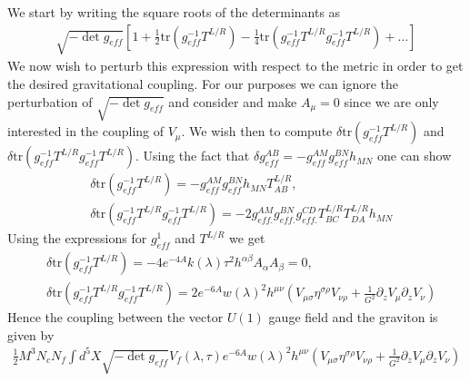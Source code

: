 \documentclass[a4paper,12pt]{article}
\begin{document}
We start by writing the square roots of the determinants as
\begin{align}
	\sqrt{-\det g_{eff}} \left[ 1 + \frac{1}{2} \text{tr} \left( g^{-1}_{eff} T^{L/R}\right) - \frac{1}{4} \text{tr} \left( g^{-1}_{eff} T^{L/R} g^{-1}_{eff} T^{L/R} \right) + \dots \right]
\end{align}
We now wish to perturb this expression with respect to the metric in order to get the desired gravitational coupling. For our purposes we can ignore the perturbation of $\sqrt{-\det g_{eff}}$ and consider and make $A_{\mu} = 0$ since we are only interested in the coupling of $V_\mu$. We wish then to compute $\delta \text{tr} \left( g^{-1}_{eff} T^{L/R}\right)$ and $\delta \text{tr} \left( g^{-1}_{eff} T^{L/R} g^{-1}_{eff} T^{L/R} \right)$. Using the fact that $\delta g^{AB}_{eff} = - g_{eff}^{AM} g_{eff}^{BN} h_{MN}$ one can show
\begin{align}
&\delta \text{tr} \left( g^{-1}_{eff} T^{L/R}\right) = -  g_{eff}^{AM} g_{eff}^{BN} h_{MN} T^{L/R}_{AB}, \\
&\delta \text{tr} \left( g^{-1}_{eff} T^{L/R} g^{-1}_{eff} T^{L/R} \right) = - 2 g^{AM}_{eff.} g^{BN}_{eff.} g^{CD}_{eff.} T^{L/R}_{BC} T^{L/R}_{DA} h_{MN}
\end{align}
Using the expressions for $g^{1}_{eff}$ and $T^{L/R}$ we get
\begin{align}
&\delta \text{tr} \left( g^{-1}_{eff} T^{L/R}\right) = - 4 e^{-4A} k\left(\lambda\right) \tau^2 h^{\alpha \beta} A_\alpha A_\beta = 0 , \\
& \delta \text{tr} \left( g^{-1}_{eff} T^{L/R} g^{-1}_{eff} T^{L/R} \right)  = 2 e^{-6A} {w\left( \lambda \right)}^2 h^{\mu \nu} \left( V_{\mu \sigma} \eta^{\sigma \rho} V_{\nu \rho} + \frac{1}{G^2} \partial_z V_\mu \partial_z V_\nu \right)
\end{align}
Hence the coupling between the vector $U(1)$ gauge field and the graviton is given by
\begin{align}
\frac{1}{2} M^3 N_c N_f \int d^5 X \sqrt{-\det g_{eff}} V_{f} \left(\lambda, \tau \right) e^{-6 A} {w\left(\lambda\right)}^2 h^{\mu \nu} \left( V_{\mu \sigma} \eta^{\sigma \rho} V_{\nu \rho} + \frac{1}{G^2} \partial_z V_\mu \partial_z V_\nu \right)
\end{align}
\end{document}
